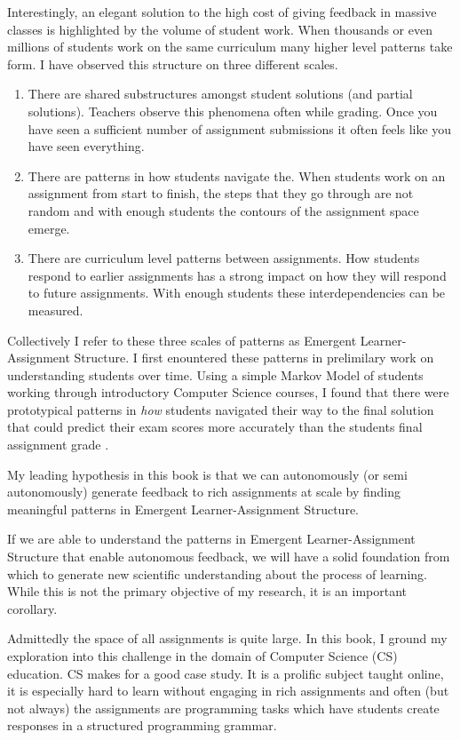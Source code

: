 Interestingly, an elegant solution to the high cost of giving feedback in massive classes is highlighted by the volume of student work. When thousands or even millions of students work on the same curriculum many higher level patterns take form. I have observed this structure on three different scales. 
\begin{enumerate}
\item There are shared substructures amongst student solutions (and partial solutions). Teachers observe this phenomena often while grading. Once you have seen a sufficient number of assignment submissions it often feels like you have seen everything. 
\item There are patterns in how students navigate the. When students work on an assignment from start to finish, the steps that they go through are not random and with enough students the contours of the assignment space emerge. 
\item There are curriculum level patterns between assignments. How students respond to earlier assignments has a strong impact on how they will respond to future assignments. With enough students these interdependencies can be measured.
\end{enumerate}
Collectively I refer to these three scales of patterns as Emergent Learner-Assignment Structure. I first enountered these patterns in prelimilary work on understanding students over time. Using a simple Markov Model of students working through introductory Computer Science courses, I found that there were prototypical patterns in \emph{how} students navigated their way to the final solution that could predict their exam scores more accurately than the students final assignment grade \cite{piech2012modeling}. 

\begin{mdframed}
My leading hypothesis in this book is that we can autonomously (or semi autonomously) generate feedback to rich assignments at scale by finding meaningful patterns in Emergent Learner-Assignment Structure. 
\end{mdframed}

If we are able to understand the patterns in Emergent Learner-Assignment Structure that enable autonomous feedback, we will have a solid foundation from which to generate new scientific understanding about the process of learning. While this is not the primary objective of my research, it is an important corollary.

Admittedly the space of all assignments is quite large. In this book, I ground my exploration into this challenge in the domain of Computer Science (CS) education. CS makes for a good case study. It is a prolific subject taught online, it is especially hard to learn without engaging in rich assignments and often (but not always) the assignments are programming tasks which have students create responses in a structured programming grammar.

